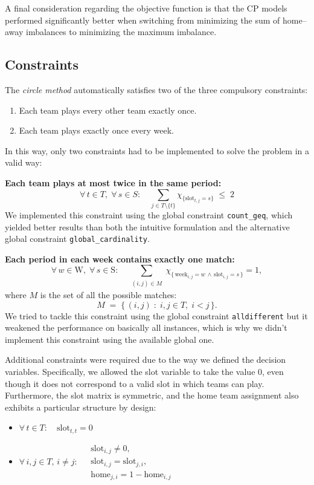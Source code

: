 \documentclass{article}
\begin{document}
A final consideration regarding the objective function is that the CP models performed significantly better when switching from minimizing the sum of home–away imbalances to minimizing the maximum imbalance.

\subsection{Constraints}
The \emph{circle method} automatically satisfies two of the three compulsory constraints:
\begin{enumerate}
    \item Each team plays every other team exactly once.
    \item Each team plays exactly once every week.
\end{enumerate}

In this way, only two constraints had to be implemented to solve the problem in a valid way:

\textbf{Each team plays at most twice in the same period:}
\[
\forall\, t \in T,\; \forall\, s \in S:\quad 
\sum_{j \in T \setminus \{t\}} \chi_{\{\text{slot}_{t,j} = s\}} \;\leq\; 2
\]
We implemented this constraint using the global constraint \texttt{count\_geq}, which yielded better results than both the intuitive formulation and the alternative global constraint \texttt{global\_cardinality}.

\textbf{Each period in each week contains exactly one match:}
\[
\forall\, w \in \text{W},\;
\forall\, s \in \text{S}:\quad
\sum_{\substack{(i,j) \in M}}
\chi_{\{\,\text{week}_{i,j} = w \,\wedge\, \text{slot}_{i,j} = s\,\}} = 1,
\]
where $M$ is the set of all the possible matches: \[
M \;=\; \bigl\{\,(i,j) \;:\; i,j \in T,\; i<j \,\bigr\}.
\]
We tried to tackle this constraint using the global constraint \texttt{alldifferent} but it weakened the performance on basically all instances, which is why we didn't implement this constraint using the available global one.

Additional constraints were required due to the way we defined the decision variables. Specifically, we allowed the slot variable to take the value $0$, even though it does not correspond to a valid slot in which teams can play. Furthermore, the slot matrix is symmetric, and the home team assignment also exhibits a particular structure by design:
\begin{itemize}
    \item $\forall\, t \in T:\quad \text{slot}_{t,t} = 0$
    \item  $\forall\, i,j \in T,\, i \ne j:\;
\begin{aligned}
& \text{slot}_{i,j} \ne 0,\\
& \text{slot}_{i,j} = \text{slot}_{j,i},\\
& \text{home}_{j,i} = 1 - \text{home}_{i,j}
\end{aligned}$
\end{itemize}
\end{document}
